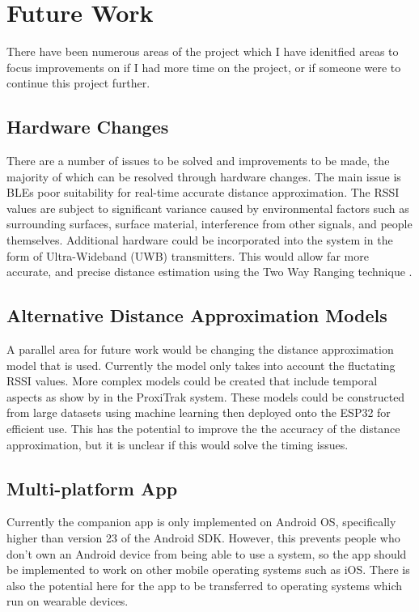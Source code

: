 \documentclass{l4proj}
\begin{document}
\section{Future Work}

There have been numerous areas of the project which I have idenitfied areas to focus improvements on if I had more time on the project, or if someone were to continue this project further.

\subsection{Hardware Changes}

There are a number of issues to be solved and improvements to be made, the majority of which can be resolved through hardware changes. The main issue is BLEs poor suitability for real-time accurate distance approximation. The RSSI values are subject to significant variance caused by environmental factors such as surrounding surfaces, surface material, interference from other signals, and people themselves. Additional hardware could be incorporated into the system in the form of Ultra-Wideband (UWB) transmitters. This would allow far more accurate, and precise distance estimation using the Two Way Ranging technique \citep{inpixon_ultra_wideband_2021}.

\subsection{Alternative Distance Approximation Models}

A parallel area for future work would be changing the distance approximation model that is used. Currently the model only takes into account the fluctating RSSI values. More complex models could be created that include temporal aspects as show by \citet{chandel_proxitrak_2020} in the ProxiTrak system. These models could be constructed from large datasets using machine learning then deployed onto the ESP32 for efficient use. This has the potential to improve the the accuracy of the distance approximation, but it is unclear if this would solve the timing issues.

\subsection{Multi-platform App}

Currently the companion app is only implemented on Android OS, specifically higher than version 23 of the Android SDK. However, this prevents people who don't own an Android device from being able to use a system, so the app should be implemented to work on other mobile operating systems such as iOS. There is also the potential here for the app to be transferred to operating systems which run on wearable devices.
\end{document}
